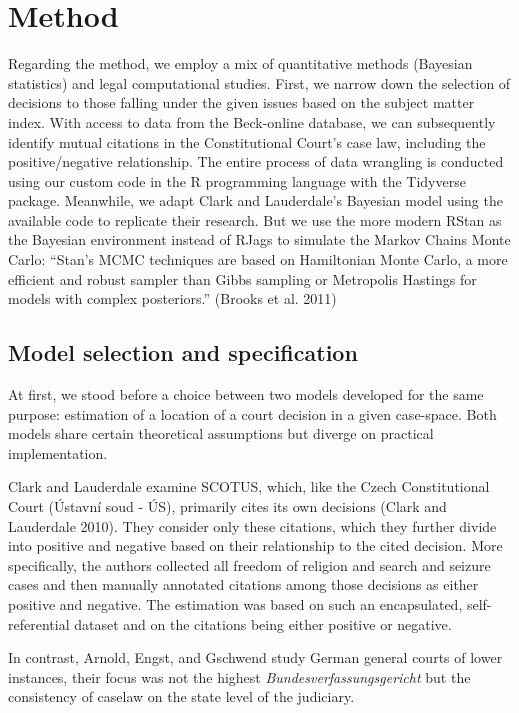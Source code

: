 \documentclass[
  11pt,
]{article}
\begin{document}
\section{Method}\label{method}

Regarding the method, we employ a mix of quantitative methods (Bayesian
statistics) and legal computational studies. First, we narrow down the
selection of decisions to those falling under the given issues based on
the subject matter index. With access to data from the Beck-online
database, we can subsequently identify mutual citations in the
Constitutional Court's case law, including the positive/negative
relationship. The entire process of data wrangling is conducted using
our custom code in the R programming language with the Tidyverse
package. Meanwhile, we adapt Clark and Lauderdale's Bayesian model using
the available code to replicate their research. But we use the more
modern RStan as the Bayesian environment instead of RJags to simulate
the Markov Chains Monte Carlo: ``Stan's MCMC techniques are based on
Hamiltonian Monte Carlo, a more efficient and robust sampler than Gibbs
sampling or Metropolis Hastings for models with complex posteriors.''
(Brooks et al. 2011)

\subsection{Model selection and
specification}\label{model-selection-and-specification}

At first, we stood before a choice between two models developed for the
same purpose: estimation of a location of a court decision in a given
case-space. Both models share certain theoretical assumptions but
diverge on practical implementation.

Clark and Lauderdale examine SCOTUS, which, like the Czech
Constitutional Court (Ústavní soud - ÚS), primarily cites its own
decisions (Clark and Lauderdale 2010). They consider only these
citations, which they further divide into positive and negative based on
their relationship to the cited decision. More specifically, the authors
collected all freedom of religion and search and seizure cases and then
manually annotated citations among those decisions as either positive
and negative. The estimation was based on such an encapsulated,
self-referential dataset and on the citations being either positive or
negative.

In contrast, Arnold, Engst, and Gschwend study German general courts of
lower instances, their focus was not the highest
\emph{Bundesverfassungsgericht} but the consistency of caselaw on the
state level of the judiciary.
\end{document}
